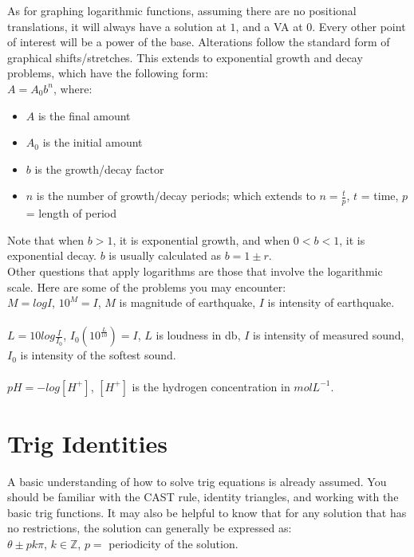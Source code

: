 \documentclass{article}
\begin{document}
As for graphing logarithmic functions, assuming there are no positional translations, it will always have a solution at $1$, and a VA at $0$. Every other point of interest will be a power of the base. Alterations follow the standard form of graphical shifts/stretches. This extends to exponential growth and decay problems, which have the following form: \\

$A = A_0b^n$, where: \begin{itemize}
    \item $A$ is the final amount
    \item $A_0$ is the initial amount
    \item $b$ is the growth/decay factor
    \item $n$ is the number of growth/decay periods; which extends to $n = \frac{t}{p}$, $t$ = time, $p$ = length of period
\end{itemize}

Note that when $b > 1$, it is exponential growth, and when $0 < b < 1$, it is exponential decay. $b$ is usually calculated as $b = 1 \pm r$. \\

Other questions that apply logarithms are those that involve the logarithmic scale. Here are some of the problems you may encounter: \\

$M = logI$, $10^M=I$, $M$ is magnitude of earthquake, $I$ is intensity of earthquake. \\ \\
$L = 10log\frac{I}{I_0}$, $I_0(10^\frac{L}{10}) = I$, $L$ is loudness in db, $I$ is intensity of measured sound, $I_0$ is intensity of the softest sound. \\ \\
$pH = -log[H^+]$, $[H^+]$ is the hydrogen concentration in $molL^{-1}$.

\section{Trig Identities}

A basic understanding of how to solve trig equations is already assumed. You should be familiar with the CAST rule, identity triangles, and working with the basic trig functions. It may also be helpful to know that for any solution that has no restrictions, the solution can generally be expressed as: \\ 

$\theta \pm pk\pi$, $k\in \mathbb{Z}$, $p=$ periodicity of the solution. \\
\end{document}

